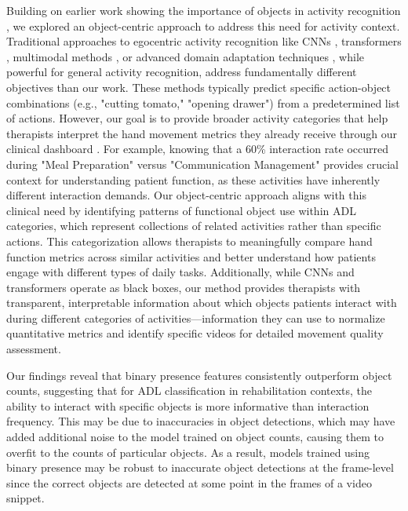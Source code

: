 \documentclass[journal,twoside,web]{ieeecolor}
\begin{document}
Building on earlier work showing the importance of objects in activity recognition \cite{Surie2007-rr, Wu2007-jc, Palmes2010-lg, Escorcia2022-sj}, we explored an object-centric approach to address this need for activity context. Traditional approaches to egocentric activity recognition like CNNs \cite{Douache2023-ez}, transformers \cite{Li2020-zg, Bertasius2021-re, Liu2021-tq, Pan2023-zq}, multimodal methods \cite{Papadakis2024-ja, Hao2024-ta}, or advanced domain adaptation techniques \cite{Liu2023-sa}, while powerful for general activity recognition, address fundamentally different objectives than our work. These methods typically predict specific action-object combinations (e.g., "cutting tomato," "opening drawer") from a predetermined list of actions. However, our goal is to provide broader activity categories that help therapists interpret the hand movement metrics they already receive through our clinical dashboard \cite{Kadambi2023-iv}. For example, knowing that a 60\% interaction rate occurred during "Meal Preparation" versus "Communication Management" provides crucial context for understanding patient function, as these activities have inherently different interaction demands. Our object-centric approach aligns with this clinical need by identifying patterns of functional object use within ADL categories, which represent collections of related activities rather than specific actions. This categorization allows therapists to meaningfully compare hand function metrics across similar activities and better understand how patients engage with different types of daily tasks. Additionally, while CNNs and transformers operate as black boxes, our method provides therapists with transparent, interpretable information about which objects patients interact with during different categories of activities—information they can use to normalize quantitative metrics and identify specific videos for detailed movement quality assessment.

Our findings reveal that binary presence features consistently outperform object counts, suggesting that for ADL classification in rehabilitation contexts, the ability to interact with specific objects is more informative than interaction frequency. This may be due to inaccuracies in object detections, which may have added additional noise to the model trained on object counts, causing them to overfit to the counts of particular objects. As a result, models trained using binary presence may be robust to inaccurate object detections at the frame-level since the correct objects are detected at some point in the frames of a video snippet.
\end{document}
